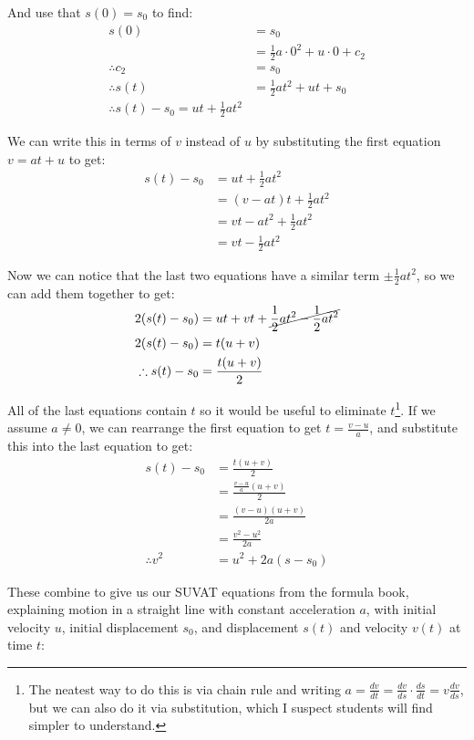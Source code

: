 And use that $s(0) = s_0$ to find:
\begin{align*}
    s(0) &= s_0 \\
    &= \frac{1}{2}a \cdot 0^2 + u \cdot 0 + c_2 \\
    \therefore c_2 &= s_0 \\
    \therefore s(t) &= \frac{1}{2}at^2 + ut + s_0 \\
    \therefore s(t) - s_0 = ut + \frac{1}{2}at^2
\end{align*}

We can write this in terms of $v$ instead of $u$ by substituting the first equation $v = at + u$ to get:
\begin{align*}
    s(t) - s_0 &= ut + \frac{1}{2}at^2 \\
    &= (v - at)t + \frac{1}{2}at^2 \\
    &= vt - at^2 + \frac{1}{2}at^2 \\
    &= vt - \frac{1}{2}at^2
\end{align*}

Now we can notice that the last two equations have a similar term $\pm \frac{1}{2}at^2$, so we can add them together to get:
\begin{align*}
    2(s(t) - s_0) &= ut + vt  + \cancel{\frac{1}{2}at^2 - \frac{1}{2}at^2}\\
    2(s(t) - s_0) &= t(u + v) \\
    \therefore s(t) - s_0 &= \frac{t(u + v)}{2}
\end{align*}

All of the last equations contain $t$ so it would be useful to eliminate $t$\footnote{The neatest way to do this is via chain rule and writing $a = \frac{dv}{dt} = \frac{dv}{ds} \cdot \frac{ds}{dt} = v \frac{dv}{ds}$, but we can also do it via substitution, which I suspect students will find simpler to understand.}. 
If we assume $a \neq 0$, we can rearrange the first equation to get $t = \frac{v - u}{a}$, and substitute this into the last equation to get:
\begin{align*}
    s(t) - s_0 &= \frac{t(u + v)}{2} \\
    &= \frac{\frac{v - u}{a}(u + v)}{2} \\
    &= \frac{(v - u)(u + v)}{2a} \\
    &= \frac{v^2 - u^2}{2a} \\
    \therefore v^2&= u^2 + 2a(s - s_0)
\end{align*}

These combine to give us our SUVAT equations from the formula book, explaining motion in a straight line with constant acceleration $a$, with initial velocity $u$, initial displacement $s_0$, and displacement $s(t)$ and velocity $v(t)$ at time $t$:

